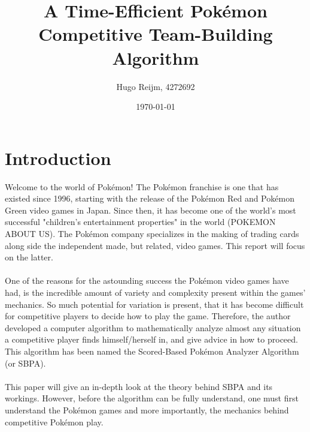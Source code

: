 \documentclass{article}
\title{A Time-Efficient Pok\'emon Competitive Team-Building Algorithm}
\author{Hugo Reijm, 4272692}
\date{\today}
\begin{document}
\maketitle
\newpage
\tableofcontents
\newpage
\section{Introduction}
Welcome to the world of Pok\'emon! The Pok\'emon franchise is one that has existed since 1996, starting with the release of the Pok\'emon Red and Pok\'emon Green video games in Japan. Since then, it has become one of the world's most successful "children's entertainment properties" in the world (POKEMON ABOUT US). The Pok\'emon  company specializes in the making of trading cards along side the independent made, but related, video games. This report will focus on the latter.\\\\
One of the reasons for the astounding success the Pok\'emon video games have had, is the incredible amount of variety and complexity present within the games' mechanics. So much potential for variation is present, that it has become difficult for competitive players to decide how to play the game. Therefore, the author developed a computer algorithm to mathematically analyze almost any situation a competitive player finds himself/herself in, and give advice in how to proceed. This algorithm has been named the Scored-Based Pok\'emon Analyzer Algorithm (or SBPA).\\\\
This paper will give an in-depth look at the theory behind SBPA and its workings. However, before the algorithm can be fully understand, one must first understand the Pok\'emon games and more importantly, the mechanics behind competitive Pok\'emon play.
\end{document}
